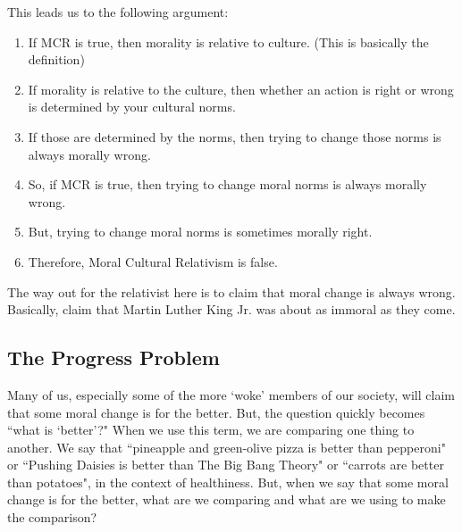 This leads us to the following argument:
\begin{enumerate}
    \item If MCR is true, then morality is relative to culture. (This is basically the definition)
    \item If morality is relative to the culture, then whether an action is right or wrong is determined by your cultural norms.
    \item If those are determined by the norms, then trying to change those norms is always morally wrong.
    \item So, if MCR is true, then trying to change moral norms is always morally wrong.
    \item But, trying to change moral norms is sometimes morally right.
    \item Therefore, Moral Cultural Relativism is false.
\end{enumerate}
The way out for the relativist here is to claim that moral change is always wrong. Basically, claim that Martin Luther King Jr. was about as immoral as they come.

\subsection{The Progress Problem}

Many of us, especially some of the more `woke' members of our society, will claim that some moral change is for the better. But, the question quickly becomes ``what is `better'?" When we use this term, we are comparing one thing to another. We say that ``pineapple and green-olive pizza is better than pepperoni" or ``Pushing Daisies is better than The Big Bang Theory" or ``carrots are better than potatoes", in the context of healthiness. But, when we say that some moral change is for the better, what are we comparing and what are we using to make the comparison?

